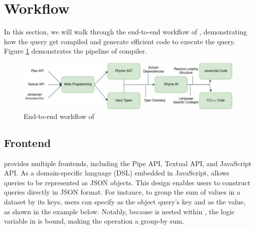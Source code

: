 \documentclass[acmsmall,nonacm]{acmart}\settopmatter{printfolios=true,printccs=false,printacmref=false}
\newcommand{\rhyme}{\text{Rhyme}\xspace}
\begin{document}
\section{Workflow}\label{workflow}
In this section, we will walk through the end-to-end workflow of \rhyme, demonstrating how the \rhyme query get compiled and generate efficient code to execute the query. Figure \ref{workflowfig} demonstrates the pipeline of \rhyme compiler.\par
\begin{figure}[H]
  \centering
      \includegraphics[scale=0.5]{figures/workflow.png}
      \caption{End-to-end workflow of \rhyme}
      \label{workflowfig}
  \end{figure}
\subsection{\rhyme Frontend}

\rhyme provides multiple frontends, including the Pipe API, Textual API, and JavaScript API. As a domain-specific language (DSL) embedded in JavaScript, \rhyme allows queries to be represented as JSON objects. This design enables users to construct queries directly in JSON format. For instance, to group the sum of values in a dataset by its keys, users can specify  as the object query's key and  as the value, as shown in the example below. Notably, because  is nested within , the logic variable in  is bound, making the operation a group-by sum.
\end{document}
